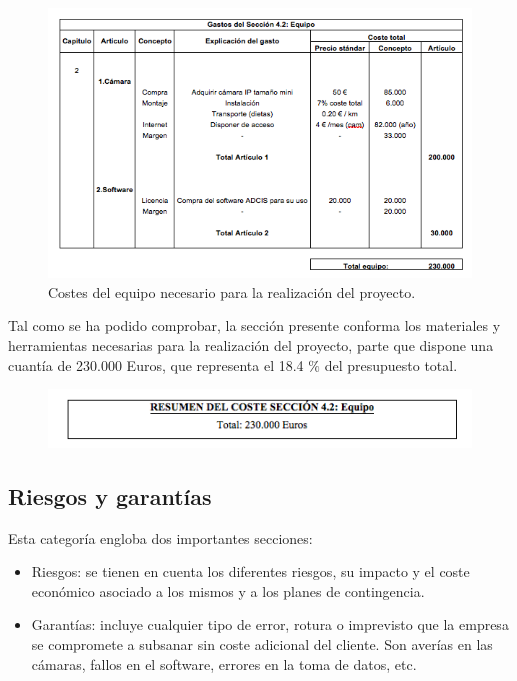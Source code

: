 \documentclass[12pt,oneside,a4paper]{article}
\numberwithin{figure}{section}
\begin{document}
\begin{figure}[H]
\begin{center}
\includegraphics[scale=.8]{Presupuesto8.png}
\caption{Costes del equipo necesario para la realización del proyecto.}
\end{center}
\end{figure}

Tal como se ha podido comprobar, la sección presente conforma los materiales y herramientas necesarias para la realización del proyecto, parte que dispone una cuantía de 230.000 Euros, que representa el 18.4 $\%$ del presupuesto total.

\begin{figure}[H]
\begin{center}
\includegraphics[scale=.9]{Presupuesto9.png}
\end{center}
\end{figure}


\subsection{Riesgos y garantías}

Esta categoría engloba dos importantes secciones:

\begin{itemize}
\item Riesgos: se tienen en cuenta los diferentes riesgos, su impacto y el coste económico asociado a los mismos y a los planes de contingencia.
\item Garantías: incluye cualquier tipo de error, rotura o imprevisto que la empresa se compromete a subsanar sin coste adicional del cliente. Son averías en las cámaras, fallos en el software, errores en la toma de datos, etc.
\end{itemize}
\end{document}
